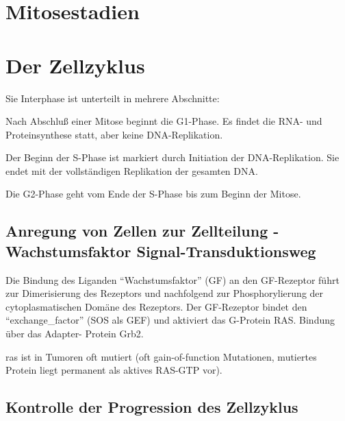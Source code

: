

\section*{Mitosestadien}

\section{Der Zellzyklus}
Sie Interphase ist unterteilt in mehrere Abschnitte:

Nach Abschluß einer Mitose beginnt die G1-Phase.
Es findet die RNA- und Proteinsynthese statt, aber keine DNA-Replikation.

Der Beginn der S-Phase ist
markiert durch Initiation der
DNA-Replikation.
Sie endet mit der
vollständigen Replikation der
gesamten DNA.

Die G2-Phase geht vom Ende der S-Phase bis zum
Beginn der Mitose.

\subsection{Anregung von Zellen zur Zellteilung - Wachstumsfaktor Signal-Transduktionsweg}
Die Bindung des Liganden
``Wachstumsfaktor'' (GF) an den
GF-Rezeptor führt zur
Dimerisierung des Rezeptors und
nachfolgend zur Phosphorylierung
der cytoplasmatischen Domäne
des Rezeptors.
Der GF-Rezeptor bindet den
``\gls{exchange_factor}'' (SOS als GEF)
und aktiviert das G-Protein RAS.
Bindung über das Adapter-
Protein Grb2.

ras ist in Tumoren oft mutiert
(oft gain-of-function Mutationen,
mutiertes Protein liegt permanent
als aktives RAS-GTP vor).



\subsection{Kontrolle der Progression des Zellzyklus}




